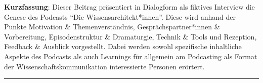 \textbf{Kurzfassung}: Dieser Beitrag präsentiert in Dialogform als
fiktives Interview die Genese des Podcasts \enquote{Die
Wissensarchitekt*innen}. Diese wird anhand der Punkte Motivation
\& Themenverständnis, Gesprächspartner*innen \& Vorbereitung,
Episodenstruktur \& Dramaturgie, Technik \& Tools und Rezeption,
Feedback \& Ausblick vorgestellt. Dabei werden sowohl spezifische
inhaltliche Aspekte des Podcasts als auch Learnings für allgemein am
Podcasting als Format der Wissenschaftskommunikation interessierte
Personen erörtert.

\begin{center}\rule{0.5\linewidth}{0.5pt}\end{center}
